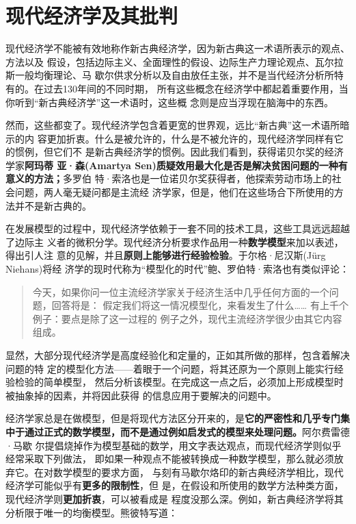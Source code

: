 \part{现代经济学及其批判}

现代经济学不能被有效地称作新古典经济学，因为新古典这一术语所表示的观点、方法以及
假设，包括边际主义、全面理性的假设、边际生产力理论观点、瓦尔拉斯一般均衡理论、马
歇尔供求分析以及自由放任主张，并不是当代经济分析所特有的。在过去130年间的不同时期，
所有这些概念在经济学中都起着重要作用，当你听到“新古典经济学”这一术语时，这些概
念则是应当浮现在脑海中的东西。

然而，这些都变了。现代经济学包含着更宽的世界观，远比“新古典”这一术语所暗示的内
容更加折衷。什么是被允许的，什么是不被允许的，现代经济学同样有它的惯例，但它们不
是新古典经济学的惯例。因此我们看到，获得诺贝尔奖的经济学家\textbf{阿玛蒂
  亚·森(Amartya Sen)质疑效用最大化是否是解决贫困问题的一种有意义的方法；}多罗伯
特·索洛也是一位诺贝尔奖获得者，他探索劳动市场上的社会问题，两人毫无疑问都是主流经
济学家，但是，他们在这些场合下所使用的方法并不是新古典的。

在发展模型的过程中，现代经济学依赖于一套不同的技术工具，这些工具远远超越了边际主
义者的微积分学。现代经济分析要求作品用一种\textbf{数学模型}来加以表述，得出引人注
意的见解，并且\textbf{原则上能够进行经验检验}。于尔格·尼汉斯(J\"urg Niehans)将经
济学的现时代称为“模型化的时代”鲍、罗伯特·索洛也有类似评论：

\begin{quotation}
  今天，如果你问一位主流经济学家关于经济生活中几乎任何方面的一个问题，回答将是：
  假定我们将这一情况模型化，来看发生了什么…… 有上千个例子：要点是除了这一过程的
  例子之外，现代主流经济学很少由其它内容组成。
\end{quotation}

显然，大部分现代经济学是高度经验化和定量的，正如其所做的那样，包含着解决问题的特
定的模型化方法——着眼于一个问题，将其还原为一个原则上能实行经验检验的简单模型，
然后分析该模型。在完成这一点之后，必须加上形成模型时被抽象掉的因素，并将因此获得
的信息应用于要解决的问题中。

经济学家总是在做模型，但是将现代方法区分开来的，是\textbf{它的严密性和几乎专门集
  中于通过正式的数学模型，而不是通过例如启发式的模型来处理问题。}阿尔费雷德·马歇
尔提倡烧掉作为模型基础的数学，用文字表达观点，而现代经济学则似乎经常采取下列做法，
即如果一种观点不能被转换成一种数学模型，那么就必须放弃它。在对数学模型的要求方面，
与刻有马歇尔烙印的新古典经济学相比，现代经济学可能似乎有\textbf{更多的限制性}，但
是，在假设和所使用的数学方法种类方面，现代经济学则\textbf{更加折衷}，可以被看成是
程度没那么深。例如，新古典经济学将其分析限于唯一的均衡模型。熊彼特写道：


